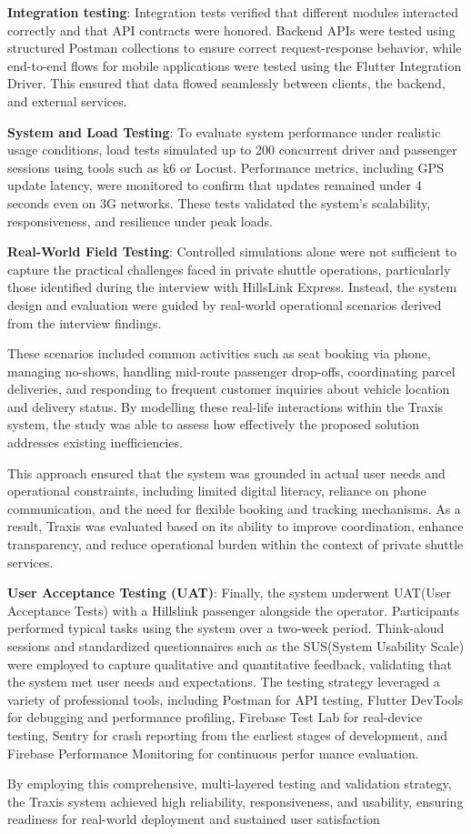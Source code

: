 \textbf{Integration testing}: Integration tests verified that different modules interacted correctly and that API contracts were honored. Backend APIs were tested using structured Postman collections to ensure correct request-response behavior, while end-to-end flows for
mobile applications were tested using the Flutter Integration Driver. This
ensured that data flowed seamlessly between clients, the backend, and external
services.


\textbf{System and Load Testing}: To evaluate system performance under realistic usage conditions, load tests simulated up to 200 concurrent driver and passenger sessions using tools such as k6 or Locust. Performance metrics, including GPS update latency, were monitored to confirm that updates remained under 4 seconds even on 3G networks. These tests validated the system’s scalability, responsiveness, and resilience under peak loads.

\textbf{Real-World Field Testing}: 
Controlled simulations alone were not sufficient to capture the practical
challenges faced in private shuttle operations, particularly those identified
during the interview with HillsLink Express. Instead, the system design and
evaluation were guided by real-world operational scenarios derived from the
interview findings.


These scenarios included common activities such as seat booking via phone,
managing no-shows, handling mid-route passenger drop-offs, coordinating parcel
deliveries, and responding to frequent customer inquiries about vehicle location
and delivery status. By modelling these real-life interactions within the Traxis
system, the study was able to assess how effectively the proposed solution
addresses existing inefficiencies.


This approach ensured that the system was grounded in actual user needs and
operational constraints, including limited digital literacy, reliance on phone
communication, and the need for flexible booking and tracking mechanisms. As a
result, Traxis was evaluated based on its ability to improve coordination,
enhance transparency, and reduce operational burden within the context of
private shuttle services.


\textbf{User Acceptance Testing (UAT)}: Finally, the system underwent UAT(User Acceptance Tests) with a Hillslink passenger alongside the operator. Participants performed typical tasks using the system over a two-week period. Think-aloud sessions and standardized questionnaires such as the SUS(System Usability Scale) were employed to capture qualitative and quantitative feedback, validating that the system met user needs and expectations.
The testing strategy leveraged a variety of professional tools, including
Postman for API testing, Flutter DevTools for debugging and performance
profiling, Firebase Test Lab for real-device testing, Sentry for crash reporting
from the earliest stages of development, and Firebase Performance Monitoring for
continuous perfor mance evaluation.


By employing this comprehensive, multi-layered testing and validation strategy,
the Traxis system achieved high reliability, responsiveness, and usability,
ensuring readiness for real-world deployment and sustained user satisfaction

